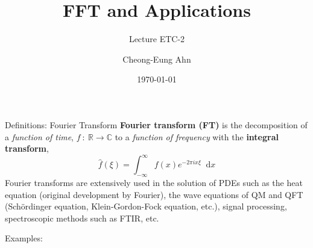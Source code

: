 \documentclass[10pt,table]{beamer}
\title[FFT]{FFT and Applications}
\subtitle{Lecture ETC-2}
\author{Cheong-Eung Ahn}
\date{\today}
\newcommand*{\diff}{\mathop{}\!\mathrm{d}} %
\begin{document}
\def\arraystretch{1.2}

\begin{frame}
\titlepage
\end{frame}

\begin{frame}{Definitions: Fourier Transform}
\textbf{Fourier transform (FT)} is the decomposition of a \textit{function of time}, $f\::\:\mathbb{R}\rightarrow\mathbb{C}$ to a \textit{function of frequency} with the \textbf{integral transform},
\begin{equation*}
\hat{f}(\xi)=\int_{-\infty}^\infty f(x)e^{-2\pi ix\xi}\diff x
\end{equation*}
Fourier transforms are extensively used in the solution of PDEs such as the heat equation (original development by Fourier), the wave equations of QM and QFT (Sch\"{o}rdinger equation, Klein-Gordon-Fock equation, etc.), signal processing, spectroscopic methods such as FTIR, etc.

\vfill

Examples:
\begin{figure}
\centering
{}
\hspace{0.04\linewidth}
\hspace{0.04\linewidth}
\end{figure}
\end{frame}
\end{document}
